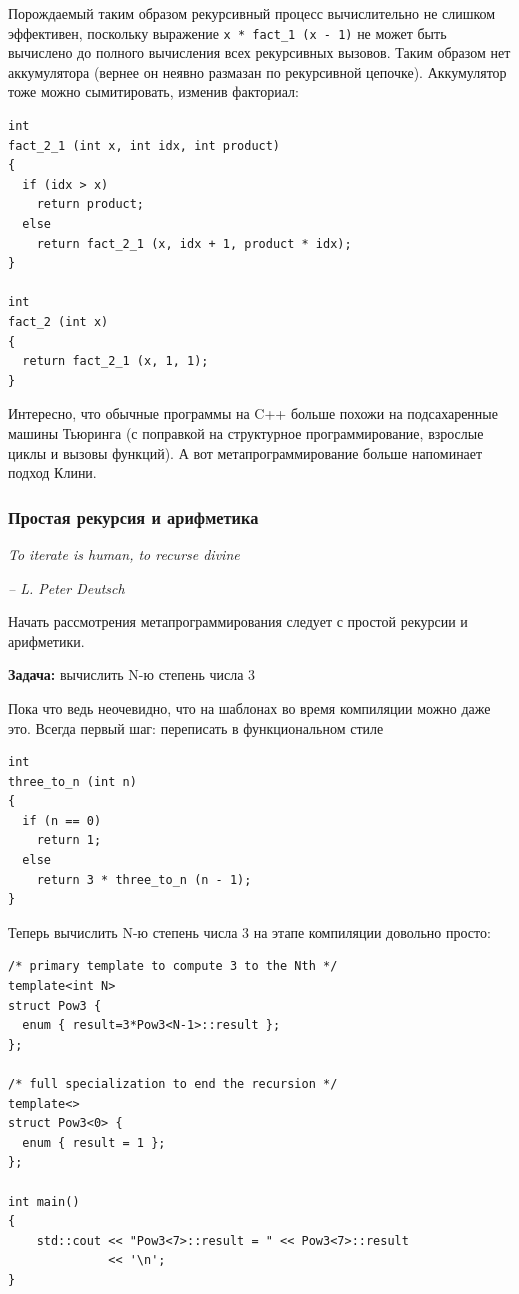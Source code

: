 \documentclass[a4paper,12pt,oneside]{article}
\begin{document}
Порождаемый таким образом рекурсивный процесс вычислительно не слишком эффективен, поскольку выражение \lstinline!x * fact_1 (x - 1)! не может быть вычислено до полного вычисления всех рекурсивных вызовов. Таким образом нет аккумулятора (вернее он неявно размазан по рекурсивной цепочке). Аккумулятор тоже можно сымитировать, изменив факториал:

\begin{lstlisting}
int
fact_2_1 (int x, int idx, int product)
{
  if (idx > x)
    return product;
  else
    return fact_2_1 (x, idx + 1, product * idx);
}

int
fact_2 (int x)
{
  return fact_2_1 (x, 1, 1);
}

\end{lstlisting}

Интересно, что обычные программы на C++ больше похожи на подсахаренные машины Тьюринга (с поправкой на структурное программирование, взрослые циклы и вызовы функций). А вот метапрограммирование больше напоминает подход Клини.

\subsubsection{Простая рекурсия и арифметика}\label{SimpleRecursion}

\hfill\textit{To iterate is human, to recurse divine}{\vspace{0.5em}}

\hfill\textit{-- L. Peter Deutsch}

Начать рассмотрения метапрограммирования следует с простой рекурсии и арифметики. 

\textbf{Задача:} вычислить N-ю степень числа 3

Пока что ведь неочевидно, что на шаблонах во время компиляции можно даже это. Всегда первый шаг: переписать в функциональном стиле

\begin{lstlisting}
int
three_to_n (int n)
{
  if (n == 0)
    return 1;
  else
    return 3 * three_to_n (n - 1);
}
\end{lstlisting}

Теперь вычислить N-ю степень числа 3 на этапе компиляции довольно просто:

\begin{lstlisting}
/* primary template to compute 3 to the Nth */
template<int N> 
struct Pow3 { 
  enum { result=3*Pow3<N-1>::result }; 
}; 

/* full specialization to end the recursion */
template<> 
struct Pow3<0> { 
  enum { result = 1 }; 
}; 

int main() 
{ 
    std::cout << "Pow3<7>::result = " << Pow3<7>::result 
              << '\n'; 
} 
\end{lstlisting}
\end{document}
